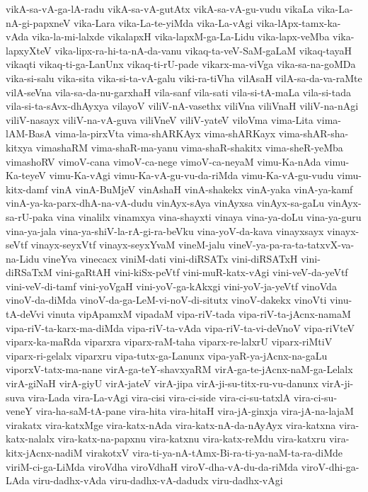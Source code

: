 {vikA-sa-vA-ga-lA-radu
vikA-sa-vA-gutAtx
vikA-sa-vA-gu-vudu
vikaLa
vika-La-nA-gi-papxneV
vika-Lara
vika-La-te-yiMda
vika-La-vAgi
vika-lApx-tamx-ka-vAda
vika-la-mi-lalxde
vikalapxH
vika-lapxM-ga-La-Lidu
vika-lapx-veMba
vika-lapxyXteV
vika-lipx-ra-hi-ta-nA-da-vanu
vikaq-ta-veV-SaM-gaLaM
vikaq-tayaH
vikaqti
vikaq-ti-ga-LanUnx
vikaq-ti-rU-pade
vikarx-ma-viVga
vika-sa-na-goMDa
vika-si-salu
vika-sita
vika-si-ta-vA-galu
viki-ra-tiVha
vilAsaH
vilA-sa-da-va-raMte
vilA-seVna
vila-sa-da-nu-garxhaH
vila-sanf
vila-sati
vila-si-tA-maLa
vila-si-tada
vila-si-ta-sAvx-dhAyxya
vilayoV
viliV-nA-vasethx
viliVna
viliVnaH
viliV-na-nAgi
viliV-nasayx
viliV-na-vA-guva
viliVneV
viliV-yateV
viloVma
vima-Lita
vima-lAM-BasA
vima-la-pirxVta
vima-shARKAyx
vima-shARKayx
vima-shAR-sha-kitxya
vimashaRM
vima-shaR-ma-yanu
vima-shaR-shakitx
vima-sheR-yeMba
vimashoRV
vimoV-cana
vimoV-ca-nege
vimoV-ca-neyaM
vimu-Ka-nAda
vimu-Ka-teyeV
vimu-Ka-vAgi
vimu-Ka-vA-gu-vu-da-riMda
vimu-Ka-vA-gu-vudu
vimu-kitx-damf
vinA
vinA-BuMjeV
vinAshaH
vinA-shakekx
vinA-yaka
vinA-ya-kamf
vinA-ya-ka-parx-dhA-na-vA-dudu
vinAyx-sAya
vinAyxsa
vinAyx-sa-gaLu
vinAyx-sa-rU-paka
vina
vinalilx
vinamxya
vina-shayxti
vinaya
vina-ya-doLu
vina-ya-guru
vina-ya-jala
vina-ya-shiV-la-rA-gi-ra-beVku
vina-yoV-da-kava
vinayxsayx
vinayx-seVtf
vinayx-seyxVtf
vinayx-seyxYvaM
vineM-jalu
vineV-ya-pa-ra-ta-tatxvX-va-na-Lidu
vineYva
vinecacx
viniM-dati
vini-diRSATx
vini-diRSATxH
vini-diRSaTxM
vini-gaRtAH
vini-kiSx-peVtf
vini-muR-katx-vAgi
vini-veV-da-yeVtf
vini-veV-di-tamf
vini-yoVgaH
vini-yoV-ga-kAkxgi
vini-yoV-ja-yeVtf
vinoVda
vinoV-da-diMda
vinoV-da-ga-LeM-vi-noV-di-situtx
vinoV-dakekx
vinoVti
vinu-tA-deVvi
vinuta
vipApamxM
vipadaM
vipa-riV-tada
vipa-riV-ta-jAcnx-namaM
vipa-riV-ta-karx-ma-diMda
vipa-riV-ta-vAda
vipa-riV-ta-vi-deVnoV
vipa-riVteV
viparx-ka-maRda
viparxra
viparx-raM-taha
viparx-re-lalxrU
viparx-riMtiV
viparx-ri-gelalx
viparxru
vipa-tutx-ga-Lanunx
vipa-yaR-ya-jAcnx-na-gaLu
viporxV-tatx-ma-nane
virA-ga-teY-shavxyaRM
virA-ga-te-jAcnx-naM-ga-Lelalx
virA-giNaH
virA-giyU
virA-jateV
virA-jipa
virA-ji-su-titx-ru-vu-danunx
virA-ji-suva
vira-Lada
vira-La-vAgi
vira-cisi
vira-ci-side
vira-ci-su-tatxlA
vira-ci-su-veneY
vira-ha-saM-tA-pane
vira-hita
vira-hitaH
vira-jA-ginxja
vira-jA-na-lajaM
virakatx
vira-katxMge
vira-katx-nAda
vira-katx-nA-da-nAyAyx
vira-katxna
vira-katx-nalalx
vira-katx-na-papxnu
vira-katxnu
vira-katx-reMdu
vira-katxru
vira-kitx-jAcnx-nadiM
virakotxV
vira-ti-ya-nA-tAmx-Bi-ra-ti-ya-naM-ta-ra-diMde
viriM-ci-ga-LiMda
viroVdha
viroVdhaH
viroV-dha-vA-du-da-riMda
viroV-dhi-ga-LAda
viru-dadhx-vAda
viru-dadhx-vA-dadudx
viru-dadhx-vAgi
}
